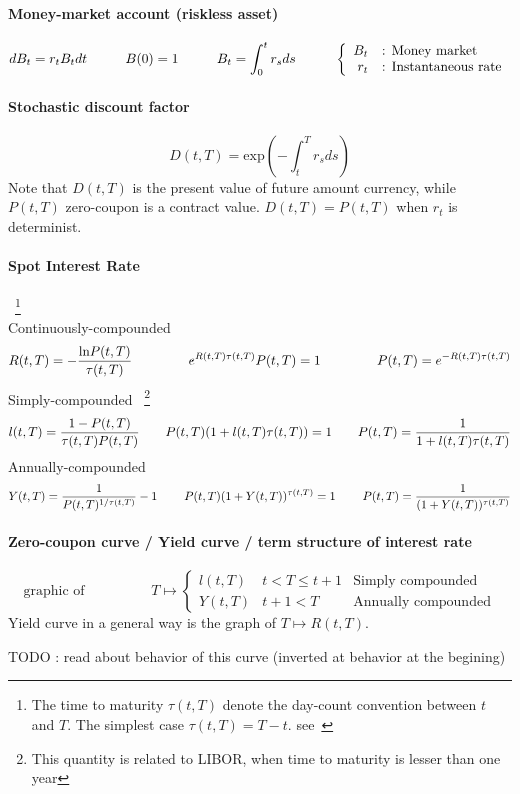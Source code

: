 \documentclass[a4paper,10pt]{article}
\newcommand{\Bt}{B_t}
\newcommand{\RtT}{R(t,T)}
\newcommand{\PtT}{P(t,T)}
\newcommand{\LtT}{l(t,T)}
\newcommand{\YtT}{Y(t,T)}
\newcommand{\tautT}{\tau(t,T)}
\newcommand{\inttT}{\int_t^T}
\newcommand{\intt}{\int_0^t}
\newcommand{\FuncExp}{\text{exp}}
\newcommand{\FuncLn}{\text{ln}}
\newcommand{\todo}[1]{\begin{center}\color{red} TODO : #1\end{center}}
\begin{document}
\paragraph{Money-market account (riskless asset)}
\[
d\Bt=r_t \Bt dt \hspace{1cm} B(0)=1 \hspace{1cm} B_t = \intt r_s ds
\hspace{1cm}
\left\{
\begin{array}{r l}
\Bt &\text{: Money market} \\
r_t &\text{: Instantaneous rate} 
\end{array}
\right.
\]
\paragraph{Stochastic discount factor} 
\[
D(t,T) = \FuncExp\left( -\inttT r_s ds \right)
\]
Note that $D(t,T)$ is the present value of future amount currency, while $\PtT$ zero-coupon is a contract value. $D(t,T)=\PtT$ when $r_t$ is determinist.
\paragraph{Spot Interest Rate}~\footnote{The time to maturity $\tautT$ denote the day-count convention between $t$ and $T$. The simplest case $\tautT=T-t$. see~\cite{PICARDO2014} }\\
Continuously-compounded 
\[
R(t,T) = -\frac{\FuncLn\PtT }{\tautT}
\hspace{1.5cm}
e^{\RtT\tautT}\PtT = 1
\hspace{1.5cm}
\PtT = e^{-\RtT\tautT}
\]
Simply-compounded ~\footnote{This quantity is related to LIBOR, when time to maturity is lesser than one year} 
\[
\LtT = \frac{1-\PtT}{\tautT\PtT}
\hspace{0.7 cm}
\PtT(1+\LtT\tautT)=1
\hspace{0.7cm}
\PtT = \frac{1}{1+\LtT\tautT}
\]
Annually-compounded
\[
\YtT = \frac{1}{\PtT^{1/\tautT}} -1
\hspace{0.8cm}
\PtT(1+\YtT)^{\tautT} = 1
\hspace{0.8cm}
\PtT = \frac{1}{(1+\YtT)^{\tautT}}
\]

\paragraph{Zero-coupon curve / Yield curve / term structure of interest rate}
\[
\text{graphic of}
\hspace{2cm}
T \longmapsto
\left\{
\begin{array}{lll}
\LtT  &  t < T \leq t+1 & \text{Simply compounded} \\
\YtT  &  t+1 < T        & \text{Annually compounded} 
\end{array}
\right.
\]
Yield curve in a general way is the graph of $T \longmapsto \RtT$.
\todo{read about behavior of this curve (inverted at behavior at the begining)}
\end{document}
